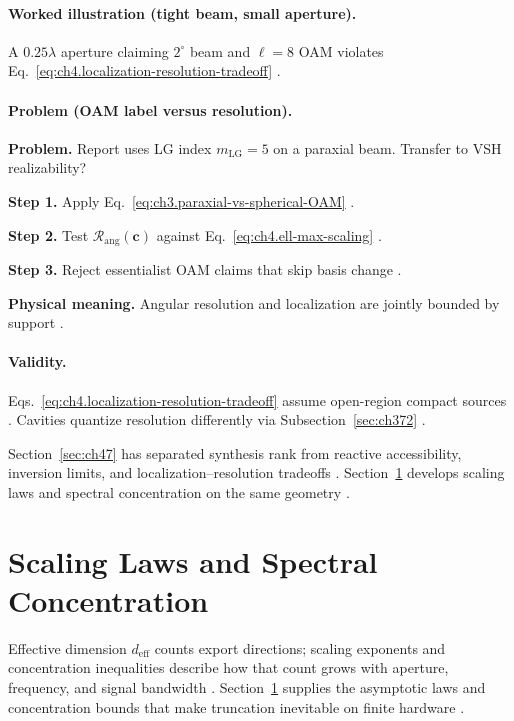\paragraph{Worked illustration (tight beam, small aperture).}
A \(0.25\lambda\) aperture claiming \(2^{\circ}\) beam and \(\ell=8\) OAM violates
Eq.~\eqref{eq:ch4.localization-resolution-tradeoff} \cite{jackson1999,harrington2001,hansen1988}.

\paragraph{Problem (OAM label versus resolution).}
\textbf{Problem.} Report uses LG index \(m_{\mathrm{LG}}=5\) on a paraxial beam. Transfer to VSH realizability?

\textbf{Step 1.} Apply Eq.~\eqref{eq:ch3.paraxial-vs-spherical-OAM} \cite{harrington2001,allen1992}.

\textbf{Step 2.} Test \(\mathcal{R}_{\mathrm{ang}}(\mathbf{c})\) against Eq.~\eqref{eq:ch4.ell-max-scaling} \cite{hansen1988}.

\textbf{Step 3.} Reject essentialist OAM claims that skip basis change \cite{stratton1941,belinfante1940}.

\textbf{Physical meaning.} Angular resolution and localization are jointly bounded by support \cite{hansen1988}.

\paragraph{Validity.}
Eqs.~\eqref{eq:ch4.localization-resolution-tradeoff} assume open-region compact sources \cite{stratton1941}. Cavities quantize
resolution differently via Subsection~\ref{sec:ch372} \cite{harrington2001}.

Section~\ref{sec:ch47} has separated synthesis rank from reactive accessibility, inversion limits, and localization--resolution
tradeoffs \cite{stratton1941,harrington2001,devaney2004}. Section~\ref{sec:ch48} develops scaling laws and spectral concentration
on the same geometry \cite{hansen1988}.


\section{Scaling Laws and Spectral Concentration}
\label{sec:ch48}

Effective dimension \(d_{\mathrm{eff}}\) counts export directions; scaling exponents and concentration inequalities describe how that
count grows with aperture, frequency, and signal bandwidth \cite{stratton1941,jackson1999,hansen1988}. Section~\ref{sec:ch48}
supplies the asymptotic laws and concentration bounds that make truncation inevitable on finite hardware \cite{harrington2001,devaney2004}.
